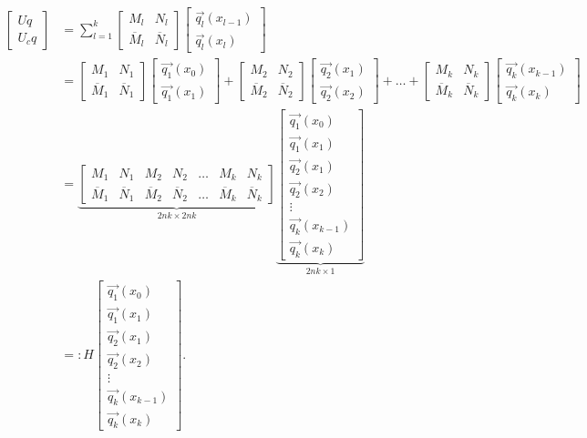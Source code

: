 \documentclass[11pt,reqno,oneside,a4paper]{article}
\theoremstyle{plain} %
\theoremstyle{definition}
\theoremstyle{remark}
\begin{document}
\begin{align*}
\begin{bmatrix}
Uq \\
U_c q
\end{bmatrix} 
&=
\sum^k_{l=1}
\begin{bmatrix}
M_l & N_l \\
\overline{M}_l & \overline{N}_l 
\end{bmatrix} 
\begin{bmatrix}
\vec{q_l}(x_{l-1})  \\
\vec{q_l}(x_{l})
\end{bmatrix} \\
&= 
\begin{bmatrix}
M_1 & N_1 \\
\overline{M}_1 & \overline{N}_1
\end{bmatrix} 
\begin{bmatrix}
\vec{q_1}(x_{0})  \\
\vec{q_1}(x_1)
\end{bmatrix} 
+ 
\begin{bmatrix}
M_2 & N_2 \\
\overline{M}_2 & \overline{N}_2
\end{bmatrix} 
\begin{bmatrix}
\vec{q_2}(x_1)  \\
\vec{q_2}(x_2)
\end{bmatrix} 
+ \ldots +
\begin{bmatrix}
M_k & N_k \\
\overline{M}_k & \overline{N}_k
\end{bmatrix} 
\begin{bmatrix}
\vec{q_k}(x_{k-1})  \\
\vec{q_k}(x_k)
\end{bmatrix} \\
&= 
\underbrace{
\begin{bmatrix}
M_1 & N_1 & M_2 & N_2 & \ldots & M_k & N_k \\
\overline{M}_1 & \overline{N}_1 & \overline{M}_2 & \overline{N}_2 & \ldots & \overline{M}_k & \overline{N}_k
\end{bmatrix} }_\text{$2nk \times 2nk$}
\underbrace{\begin{bmatrix}
\vec{q_1}(x_{0})  \\
\vec{q_1}(x_1) \\
\vec{q_2}(x_1)  \\
\vec{q_2}(x_2) \\
\vdots \\
\vec{q_k}(x_{k-1})  \\
\vec{q_k}(x_k)
\end{bmatrix}}_\text{$2nk\times 1$} \\
&=:
H
\begin{bmatrix}
\vec{q_1}(x_{0})  \\
\vec{q_1}(x_1) \\
\vec{q_2}(x_1)  \\
\vec{q_2}(x_2) \\
\vdots \\
\vec{q_k}(x_{k-1})  \\
\vec{q_k}(x_k)
\end{bmatrix}.
\end{align*}
\end{document}
